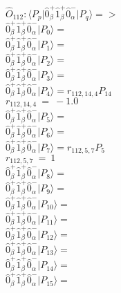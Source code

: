 \documentclass[14pt]{article}
\begin{document}
    $\hat{O}_{112}:  \langle{P_p}\vert \hat{0}_{\beta}^{+}\hat{1}_{\beta}^{+}\hat{0}_{\alpha}^{-} \vert{P_q}\rangle => $ \\ 
    $ \hat{0}_{\beta}^{+}\hat{1}_{\beta}^{+}\hat{0}_{\alpha}^{-} \vert{P_{0}}\rangle =  $ \\ 
    $ \hat{0}_{\beta}^{+}\hat{1}_{\beta}^{+}\hat{0}_{\alpha}^{-} \vert{P_{1}}\rangle =  $ \\ 
    $ \hat{0}_{\beta}^{+}\hat{1}_{\beta}^{+}\hat{0}_{\alpha}^{-} \vert{P_{2}}\rangle =  $ \\ 
    $ \hat{0}_{\beta}^{+}\hat{1}_{\beta}^{+}\hat{0}_{\alpha}^{-} \vert{P_{3}}\rangle =  $ \\ 
    $ \hat{0}_{\beta}^{+}\hat{1}_{\beta}^{+}\hat{0}_{\alpha}^{-} \vert{P_{4}}\rangle = {r}_{112,14,4}P_{14} $ \\ 
    ${r}_{112,14,4}\ =\ -1.0 $ \\ 
    $ \hat{0}_{\beta}^{+}\hat{1}_{\beta}^{+}\hat{0}_{\alpha}^{-} \vert{P_{5}}\rangle =  $ \\ 
    $ \hat{0}_{\beta}^{+}\hat{1}_{\beta}^{+}\hat{0}_{\alpha}^{-} \vert{P_{6}}\rangle =  $ \\ 
    $ \hat{0}_{\beta}^{+}\hat{1}_{\beta}^{+}\hat{0}_{\alpha}^{-} \vert{P_{7}}\rangle = {r}_{112,5,7}P_{5} $ \\ 
    ${r}_{112,5,7}\ =\ 1 $ \\ 
    $ \hat{0}_{\beta}^{+}\hat{1}_{\beta}^{+}\hat{0}_{\alpha}^{-} \vert{P_{8}}\rangle =  $ \\ 
    $ \hat{0}_{\beta}^{+}\hat{1}_{\beta}^{+}\hat{0}_{\alpha}^{-} \vert{P_{9}}\rangle =  $ \\ 
    $ \hat{0}_{\beta}^{+}\hat{1}_{\beta}^{+}\hat{0}_{\alpha}^{-} \vert{P_{10}}\rangle =  $ \\ 
    $ \hat{0}_{\beta}^{+}\hat{1}_{\beta}^{+}\hat{0}_{\alpha}^{-} \vert{P_{11}}\rangle =  $ \\ 
    $ \hat{0}_{\beta}^{+}\hat{1}_{\beta}^{+}\hat{0}_{\alpha}^{-} \vert{P_{12}}\rangle =  $ \\ 
    $ \hat{0}_{\beta}^{+}\hat{1}_{\beta}^{+}\hat{0}_{\alpha}^{-} \vert{P_{13}}\rangle =  $ \\ 
    $ \hat{0}_{\beta}^{+}\hat{1}_{\beta}^{+}\hat{0}_{\alpha}^{-} \vert{P_{14}}\rangle =  $ \\ 
    $ \hat{0}_{\beta}^{+}\hat{1}_{\beta}^{+}\hat{0}_{\alpha}^{-} \vert{P_{15}}\rangle =  $ \\ 
    
\end{document}
